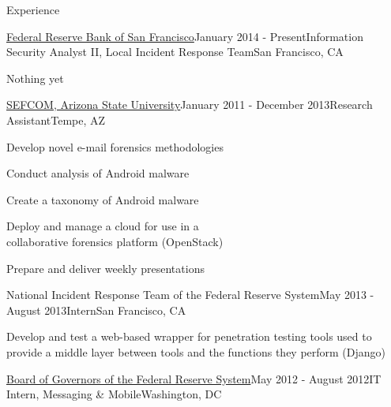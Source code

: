\documentclass{resume} %
\begin{document}
\begin{rSection}{Experience}

\begin{rSubsection}{\href{http://www.frbsf.org/}{Federal Reserve Bank of San Francisco}}{January 2014 - Present}{Information Security Analyst II, Local Incident Response Team}{San Francisco, CA}

	\item Nothing yet
	
\end{rSubsection}


\begin{rSubsection}{\href{http://sefcom.asu.edu/}{SEFCOM, Arizona State University}}{January 2011 - December 2013}{Research Assistant}{Tempe, AZ}

	\medskip %
	\begin{multicols}{2}
		\item Develop novel e-mail forensics methodologies
		\item Conduct  analysis of Android malware
		\item Create a taxonomy of Android malware
		\item Deploy and manage a cloud for use in a \\ collaborative forensics platform (OpenStack)
		\item Prepare  and deliver weekly presentations
	\end{multicols}

\end{rSubsection}


\begin{rSubsection}{National Incident Response Team of the Federal Reserve System}{May 2013 - August 2013}{Intern}{San Francisco, CA}

	\item Develop and test a web-based wrapper for penetration testing tools used to provide a middle layer between tools and the functions they perform \hfill (Django)

\end{rSubsection}


\begin{rSubsection}{\href{http://www.federalreserve.gov/}{Board of Governors of the Federal Reserve System}}{May 2012 - August 2012}{IT Intern, Messaging \& Mobile}{Washington, DC}


\end{rSubsection}
\end{rSection}
\end{document}
